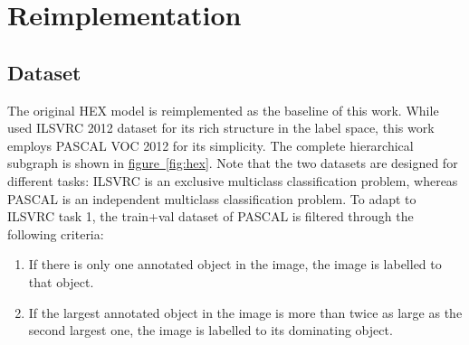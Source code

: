 \documentclass[11pt,a4paper]{article}
\begin{document}
\section{Reimplementation}
\subsection{Dataset}
\label{sec:data}

The original HEX model is reimplemented as the baseline of this work. While \cite{deng2014large} used ILSVRC 2012 dataset for its rich structure in the label space, this work employs PASCAL VOC 2012 \cite{pascal-voc-2012} for its simplicity. The complete hierarchical subgraph is shown in \hyperref[fig:hex]{figure~\ref{fig:hex}}. Note that the two datasets are designed for different tasks: ILSVRC is an exclusive multiclass classification problem, whereas PASCAL is an independent multiclass classification problem. To adapt to ILSVRC task 1, the train+val dataset of PASCAL is filtered through the following criteria:
\begin{enumerate}
\item If there is only one annotated object in the image, the image is labelled to that object.
\item If the largest annotated object in the image is more than twice as large as the second largest one, the image is labelled to its dominating object.
\end{enumerate}
\end{document}
